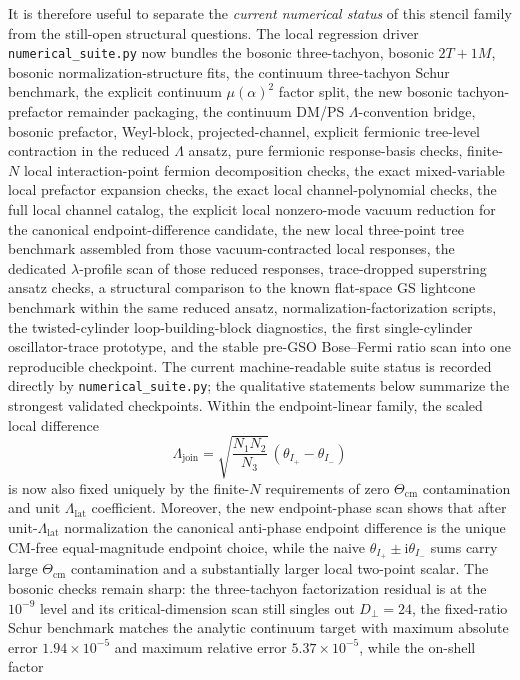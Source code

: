 \documentclass[11pt]{article}
\numberwithin{equation}{section}
\newcommand{\ii}{\mathrm{i}}
\begin{document}
It is therefore useful to separate the \emph{current numerical status} of this stencil family from the still-open structural questions. The local regression driver \texttt{numerical\_suite.py} now bundles the bosonic three-tachyon, bosonic $2T+1M$, bosonic normalization-structure fits, the continuum three-tachyon Schur benchmark, the explicit continuum $\mu(\alpha)^2$ factor split, the new bosonic tachyon-prefactor remainder packaging, the continuum DM/PS $\Lambda$-convention bridge, bosonic prefactor, Weyl-block, projected-channel, explicit fermionic tree-level contraction in the reduced $\Lambda$ ansatz, pure fermionic response-basis checks, finite-$N$ local interaction-point fermion decomposition checks, the exact mixed-variable local prefactor expansion checks, the exact local channel-polynomial checks, the full local channel catalog, the explicit local nonzero-mode vacuum reduction for the canonical endpoint-difference candidate, the new local three-point tree benchmark assembled from those vacuum-contracted local responses, the dedicated $\lambda$-profile scan of those reduced responses, trace-dropped superstring ansatz checks, a structural comparison to the known flat-space GS lightcone benchmark within the same reduced ansatz, normalization-factorization scripts, the twisted-cylinder loop-building-block diagnostics, the first single-cylinder oscillator-trace prototype, and the stable pre-GSO Bose--Fermi ratio scan into one reproducible checkpoint. The current machine-readable suite status is recorded directly by \texttt{numerical\_suite.py}; the qualitative statements below summarize the strongest validated checkpoints. Within the endpoint-linear family, the scaled local difference
\[
\Lambda_{\mathrm{join}}
=
\sqrt{\frac{N_1N_2}{N_3}}\,(\theta_{I_+}-\theta_{I_-})
\]
is now also fixed uniquely by the finite-$N$ requirements of zero
$\Theta_{\mathrm{cm}}$ contamination and unit $\Lambda_{\mathrm{lat}}$
coefficient. Moreover, the new endpoint-phase scan shows that after
unit-$\Lambda_{\mathrm{lat}}$ normalization the canonical anti-phase endpoint
difference is the unique CM-free equal-magnitude endpoint choice, while the
naive $\theta_{I_+}\pm\ii\theta_{I_-}$ sums carry large
$\Theta_{\mathrm{cm}}$ contamination and a substantially larger local
two-point scalar. The bosonic checks remain sharp: the three-tachyon
factorization residual is at the $10^{-9}$ level and its critical-dimension
scan still singles out $D_\perp=24$, the fixed-ratio Schur benchmark matches
the analytic continuum target with maximum absolute error $1.94\times 10^{-5}$
and maximum relative error $5.37\times 10^{-5}$, while the on-shell factor
\end{document}
